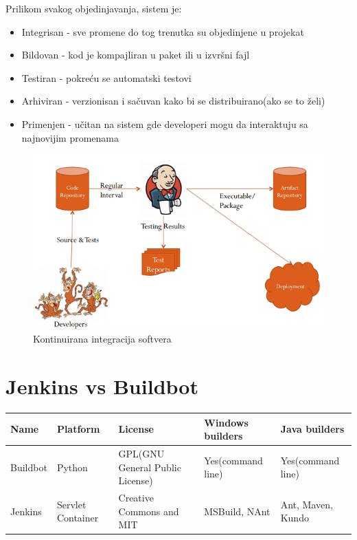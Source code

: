 \documentclass[a4paper]{article}
\begin{document}
{Prilikom svakog objedinjavanja, sistem je:
\begin{itemize}
\item Integrisan - sve promene do tog trenutka su objedinjene u projekat
\item Bildovan - kod je kompajliran u paket ili u izvršni fajl
\item Testiran - pokreću se automatski testovi
\item Arhiviran - verzionisan i sačuvan kako bi se distribuirano(ako se to želi)
\item Primenjen - učitan na sistem gde developeri mogu da interaktuju sa najnovijim promenama
\end{itemize} 

\begin{figure}[ht]
\begin{center}
\includegraphics[scale=0.75, totalheight=0.35\textheight]{slike/workflow.png}
\end{center}
\caption{Kontinuirana integracija softvera}
\label{fig:kontinuirana_integracija_softvera}
\end{figure}







\section{Jenkins vs Buildbot}
\begin{center}
\begin{tabular}{|p{2cm}|p{2cm}|p{2cm}|p{2cm}|p{2cm}|}
\hline
Name & Platform & License & Windows builders & Java builders \\ \hline
Buildbot & Python & GPL(GNU General Public License) & Yes(command line) & Yes(command line) \\ \hline
Jenkins & Servlet Container & Creative Commons and MIT & MSBuild, NAnt & Ant, Maven, Kundo \\ \hline
\end{tabular}
\end{center} 

}
\end{document}
